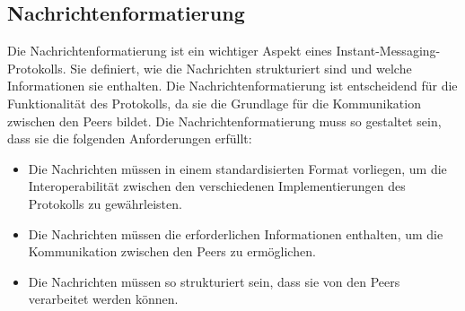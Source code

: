 \subsection{Nachrichtenformatierung}

Die Nachrichtenformatierung ist ein wichtiger Aspekt eines Instant-Messaging-Protokolls. Sie definiert, wie die Nachrichten strukturiert sind und welche Informationen sie enthalten. Die Nachrichtenformatierung ist entscheidend für die Funktionalität des Protokolls, da sie die Grundlage für die Kommunikation zwischen den Peers bildet. Die Nachrichtenformatierung muss so gestaltet sein, dass sie die folgenden Anforderungen erfüllt:

\begin{itemize}
    \item Die Nachrichten müssen in einem standardisierten Format vorliegen, um die Interoperabilität zwischen den verschiedenen Implementierungen des Protokolls zu gewährleisten.
    \item Die Nachrichten müssen die erforderlichen Informationen enthalten, um die Kommunikation zwischen den Peers zu ermöglichen.
    \item Die Nachrichten müssen so strukturiert sein, dass sie von den Peers verarbeitet werden können.
\end{itemize}
